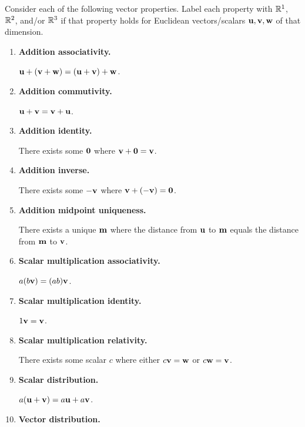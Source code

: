 
\begin{applicationActivities}{1}{8}


\begin{activity}{25}
Consider each of the following vector properties. Label each property
with \(\mathbb{R}^1\), \(\mathbb{R}^2\), and/or \(\mathbb{R}^3\) if that property holds for
Euclidean vectors/scalars \(\mathbf u,\mathbf v,\mathbf w\) of that dimension.
\begin{multicols}{2}
\begin{enumerate}
  \item \textbf{Addition associativity.}

        \(\mathbf u+(\mathbf v+\mathbf w)=
        (\mathbf u+\mathbf v)+\mathbf w\).
  \item \textbf{Addition commutivity.}

        \(\mathbf u+\mathbf v=
        \mathbf v+\mathbf u\).
  \item \textbf{Addition identity.}

        There exists some \(\mathbf 0\)
        where \(\mathbf v+\mathbf 0=\mathbf v\).
  \item \textbf{Addition inverse.}

        There exists some \(-\mathbf v\)
        where \(\mathbf v+(-\mathbf v)=\mathbf 0\).
  \item \textbf{Addition midpoint uniqueness.}

        There exists a unique \(\mathbf m\) where the distance from
        \(\mathbf u\) to \(\mathbf m\) equals the distance from \(\mathbf m\)
        to \(\mathbf v\).
  \item \textbf{Scalar multiplication associativity.}

        \(a(b\mathbf v)=(ab)\mathbf v\).
  \item \textbf{Scalar multiplication identity.}

        \(1\mathbf v=\mathbf v\).
  \item \textbf{Scalar multiplication relativity.}

        There exists some scalar \(c\) where either \(c\mathbf v=\mathbf w\)
        or \(c\mathbf w=\mathbf v\).
  \item \textbf{Scalar distribution.}

        \(a(\mathbf u+\mathbf v)=a\mathbf u+a\mathbf v\).
  \item \textbf{Vector distribution.}


\end{enumerate}
\end{multicols}
\end{activity}
\end{applicationActivities}
